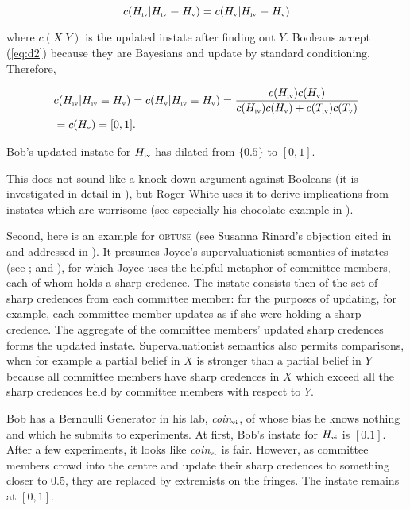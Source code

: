 \documentclass[11pt]{article}
\begin{document}
\begin{equation}
  \label{eq:d2}
  c(H_{\mbox{\tiny{iv}}}|H_{\mbox{\tiny{iv}}}\equiv{}H_{\mbox{\tiny{v}}})=c(H_{\mbox{\tiny{v}}}|H_{\mbox{\tiny{iv}}}\equiv{}H_{\mbox{\tiny{v}}})
\end{equation}

where $c(X|Y)$ is the updated instate after finding out $Y$. Booleans
accept (\ref{eq:d2}) because they are Bayesians and update by standard
conditioning. Therefore,

\begin{align}
  \label{eq:d3}
  &c(H_{\mbox{\tiny{iv}}}|H_{\mbox{\tiny{iv}}}\equiv{}H_{\mbox{\tiny{v}}})=c(H_{\mbox{\tiny{v}}}|H_{\mbox{\tiny{iv}}}\equiv{}H_{\mbox{\tiny{v}}})=\frac{c(H_{\mbox{\tiny{iv}}})c(H_{\mbox{\tiny{v}}})}{c(H_{\mbox{\tiny{iv}}})c(H_{\mbox{\tiny{v}}})+c(T_{\mbox{\tiny{iv}}})c(T_{\mbox{\tiny{v}}})} \notag \\
  &=c(H_{\mbox{\tiny{v}}})=[0,1].
\end{align}

Bob's updated instate for $H_{\mbox{\tiny{iv}}}$ has dilated from
$\{0.5\}$ to $[0,1]$.

This does not sound like a knock-down argument against Booleans (it is
investigated in detail in ), but
Roger White uses it to derive implications from instates which are
worrisome (see especially his chocolate example in
).

Second, here is an example for \textsc{obtuse} (see Susanna Rinard's
objection cited in  and addressed in
). It presumes Joyce's supervaluationist
semantics of instates (see ; and
), for which Joyce uses the helpful metaphor of
committee members, each of whom holds a sharp credence. The instate
consists then of the set of sharp credences from each committee
member: for the purposes of updating, for example, each committee
member updates as if she were holding a sharp credence. The aggregate
of the committee members' updated sharp credences forms the updated
instate. Supervaluationist semantics also permits comparisons, when
for example a partial belief in $X$ is stronger than a partial belief
in $Y$ because all committee members have sharp credences in $X$ which
exceed all the sharp credences held by committee members with respect
to $Y$.

\begin{quotex}
  \label{ex:obtuse} Bob has a Bernoulli
  Generator in his lab, \textit{coin}$_{\mbox{\tiny{vi}}}$, of whose
  bias he knows nothing and which he submits to experiments. At first,
  Bob's instate for $H_{\mbox{\tiny{vi}}}$ is $[0.1]$. After a few
  experiments, it looks like \textit{coin}$_{\mbox{\tiny{vi}}}$ is
  fair. However, as committee members crowd into the centre and update
  their sharp credences to something closer to $0.5$, they are
  replaced by extremists on the fringes. The instate remains at
  $[0,1]$. 
\end{quotex}
\end{document}
